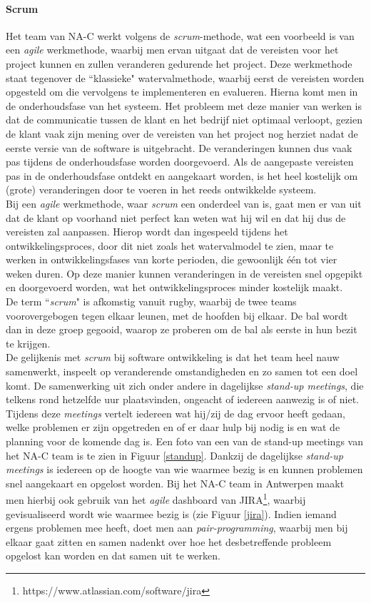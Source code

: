 \documentclass[10pt,a4paper]{article}
\begin{document}
\paragraph{Scrum}
Het team van NA-C werkt volgens de \textit{scrum}-methode, wat een voorbeeld is van een \textit{agile} werkmethode, waarbij men ervan uitgaat dat de vereisten voor het project kunnen en zullen veranderen gedurende het project. Deze werkmethode staat tegenover de ``klassieke" watervalmethode, waarbij eerst de vereisten worden opgesteld om die vervolgens te implementeren en evalueren. Hierna komt men in de onderhoudsfase van het systeem. Het probleem met deze manier van werken is dat de communicatie tussen de klant en het bedrijf niet optimaal verloopt, gezien de klant vaak zijn mening over de vereisten van het project nog herziet nadat de eerste versie van de software is uitgebracht. De veranderingen kunnen dus vaak pas tijdens de onderhoudsfase worden doorgevoerd. Als de aangepaste vereisten pas in de onderhoudsfase ontdekt en aangekaart worden, is het heel kostelijk om (grote) veranderingen door te voeren in het reeds ontwikkelde systeem.\\
Bij een \textit{agile} werkmethode, waar \textit{scrum} een onderdeel van is, gaat men er van uit dat de klant op voorhand niet perfect kan weten wat hij wil en dat hij dus de vereisten zal aanpassen. Hierop wordt dan ingespeeld tijdens het ontwikkelingsproces, door dit niet zoals het watervalmodel te zien, maar te werken in ontwikkelingsfases van korte perioden, die gewoonlijk \'e\'en tot vier weken duren. Op deze manier kunnen veranderingen in de vereisten snel opgepikt en doorgevoerd worden, wat het ontwikkelingsproces minder kostelijk maakt.\\
De term ``\textit{scrum}" is afkomstig vanuit rugby, waarbij de twee teams voorovergebogen tegen elkaar leunen, met de hoofden bij elkaar. De bal wordt dan in deze groep gegooid, waarop ze proberen om de bal als eerste in hun bezit te krijgen.\\
De gelijkenis met \textit{scrum} bij software ontwikkeling is dat het team heel nauw samenwerkt, inspeelt op veranderende omstandigheden en zo samen tot een doel komt. De samenwerking uit zich onder andere in dagelijkse \textit{stand-up meetings}, die telkens rond hetzelfde uur plaatsvinden, ongeacht of iedereen aanwezig is of niet. Tijdens deze \textit{meetings} vertelt iedereen wat hij/zij de dag ervoor heeft gedaan, welke problemen er zijn opgetreden en of er daar hulp bij nodig is en wat de planning voor de komende dag is. Een foto van een van de stand-up meetings van het NA-C team is te zien in Figuur \ref{standup}. Dankzij de dagelijkse \textit{stand-up meetings} is iedereen op de hoogte van wie waarmee bezig is en kunnen problemen snel aangekaart en opgelost worden. Bij het NA-C team in Antwerpen maakt men hierbij ook gebruik van het \textit{agile} dashboard van JIRA\footnote{https://www.atlassian.com/software/jira}, waarbij gevisualiseerd wordt wie waarmee bezig is (zie Figuur \ref{jira}). Indien iemand ergens problemen mee heeft, doet men aan \textit{pair-programming}, waarbij men bij elkaar gaat zitten en samen nadenkt over hoe het desbetreffende probleem opgelost kan worden en dat samen uit te werken.\\
\end{document}
